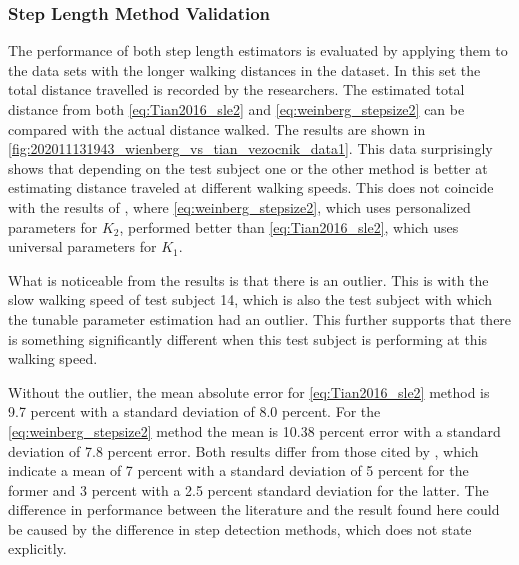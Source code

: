 \subsubsection{Step Length Method Validation}
\label{sec:results-step_length-validation}
The performance of both step length estimators is evaluated by applying them to the data sets with the longer walking distances in the \citet{Vezocnik2019} dataset. In this set the total distance travelled is recorded by the researchers. The estimated total distance from both \eqref{eq:Tian2016_sle2} and \eqref{eq:weinberg_stepsize2} can be compared with the actual distance walked. The results are shown in  \cref{fig:202011131943_wienberg_vs_tian_vezocnik_data1}. This data surprisingly shows that depending on the test subject one or the other method is better at estimating distance traveled at different walking speeds. This does not coincide with the results of \cite{Vezocnik2019}, where \eqref{eq:weinberg_stepsize2}, which uses personalized parameters for $ K_2 $, performed better than \eqref{eq:Tian2016_sle2}, which uses universal parameters for $ K_1 $. \par 

What is noticeable from the results is that there is an outlier. This is with the slow walking speed of test subject 14, which is also the test subject with which the tunable parameter estimation had an outlier. This further supports that there is something significantly different when this test subject is performing at this walking speed.\par 

 Without the outlier, the mean absolute error for \eqref{eq:Tian2016_sle2} method is 9.7 percent with a standard deviation of 8.0 percent. For the \eqref{eq:weinberg_stepsize2} method the mean is 10.38 percent error with a standard deviation of 7.8 percent error. Both results differ from those cited by \cite{Vezocnik2019}, which indicate a mean of 7 percent with a standard deviation of 5 percent for the former and 3 percent with a 2.5 percent standard deviation for the latter.
 The difference in performance between the literature and the result found here could be caused by the difference in step detection methods, which \cite{Vezocnik2019} does not state explicitly.

